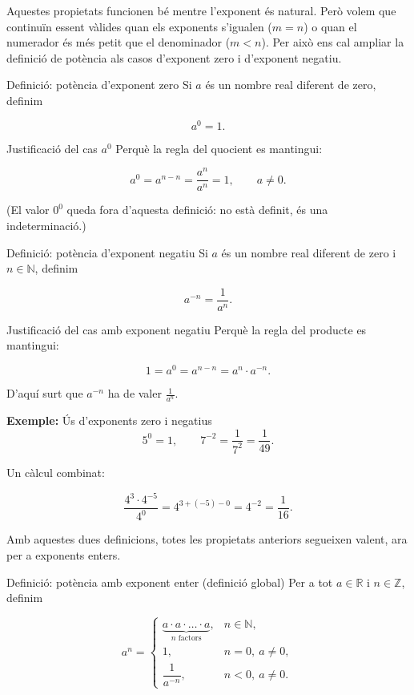 Aquestes propietats funcionen bé mentre l'exponent és natural. Però volem que continuïn essent vàlides quan els exponents s'igualen ($m=n$) o quan el numerador és més petit que el denominador ($m<n$). Per això ens cal ampliar la definició de potència als casos d'exponent zero i d'exponent negatiu.

\begin{definicio}{Definició: potència d'exponent zero}
Si $a$ és un nombre real diferent de zero, definim

\[
a^0 = 1.
\]
\end{definicio}

\begin{nota}{Justificació del cas $a^0$}
Perquè la regla del quocient es mantingui:

\[
a^0 = a^{n-n} = \frac{a^n}{a^n} = 1, \qquad a\neq 0.
\]

(El valor $0^0$ queda fora d'aquesta definició: no està definit, és una indeterminació.)
\end{nota}

\begin{definicio}{Definició: potència d'exponent negatiu}
Si $a$ és un nombre real diferent de zero i $n\in\mathbb{N}$, definim

\[
a^{-n} = \frac{1}{a^n}.
\]
\end{definicio}

\begin{nota}{Justificació del cas amb exponent negatiu}
Perquè la regla del producte es mantingui:

\[
1 = a^0 = a^{n-n} = a^{n} \cdot a^{-n}.
\]

D'aquí surt que $a^{-n}$ ha de valer $\tfrac{1}{a^n}$.
\end{nota}

\begin{exemple}{\textbf{Exemple:} Ús d'exponents zero i negatius}
\[
5^0 = 1, \qquad 7^{-2} = \frac{1}{7^2} = \frac{1}{49}.
\]

Un càlcul combinat:

\[
\frac{4^3 \cdot 4^{-5}}{4^0} = 4^{3+(-5)-0} = 4^{-2} = \frac{1}{16}.
\]
\end{exemple}

Amb aquestes dues definicions, totes les propietats anteriors segueixen valent, ara per a exponents enters.

\begin{definicio}{Definició: potència amb exponent enter (definició global)}
Per a tot $a\in\mathbb{R}$ i $n\in\mathbb{Z}$, definim

\[
a^n=
\begin{cases}
\underbrace{a\cdot a \cdot \ldots \cdot a}_{n\text{ factors}}, & n\in\mathbb{N},\\[6pt]
1, & n=0,\ a\neq 0,\\[6pt]
\dfrac{1}{a^{-n}}, & n<0,\ a\neq 0.
\end{cases}
\]
\end{definicio}

